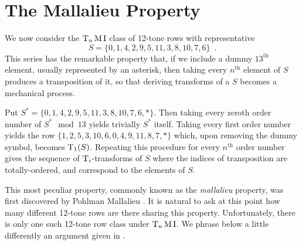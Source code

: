 \chapter{The Mallalieu Property}
\label{mallalieu-section}

We now consider the $\operatorname{T}_n\operatorname{M}\operatorname{I}$ class of 12-tone rows with representative
\begin{equation}
	S = \{ 0, 1, 4, 2, 9, 5, 11, 3, 8, 10, 7, 6 \} \enspace.
\end{equation}
This series has the remarkable property that, if we include a dummy $13^\text{th}$ element, usually represented by an asterisk, then taking every $n^\text{th}$ element of $S$ produces a transposition of it, so that deriving transforms of a $S$ becomes a mechanical process.

\begin{example}
	Put $S^* = \{ 0, 1, 4, 2, 9, 5, 11, 3, 8, 10, 7, 6, * \}$. Then taking every zeroth order number of $S^* \mod 13$ yields trivially $S^*$ itself. Taking every first order number yields the row $\{ 1, 2, 5, 3, 10, 6, 0, 4, 9, 11, 8, 7, * \}$ which, upon removing the dummy symbol, becomes $\operatorname{T}_1(S)$. Repeating this procedure for every $n^\text{th}$ order number gives the sequence of $\operatorname{T}_i$-transforms of $S$ where the indices of transposition are totally-ordered, and correspond to the elements of $S$.
\end{example}

This most peculiar property, commonly known as the \emph{mallalieu} property, was first discovered by Pohlman Mallalieu \cite[285]{Lewin1966}. It is natural to ask at this point how many different 12-tone rows are there sharing this property. Unfortunately, there is only one such 12-tone row class under $\operatorname{T}_n\operatorname{M}\operatorname{I}$. We phrase below a little differently an argument given in \cite[17]{Morris1976}.

